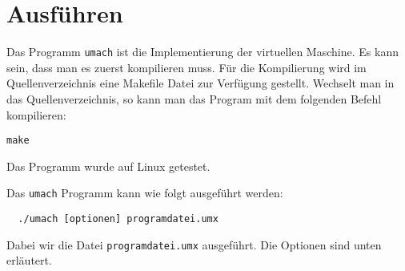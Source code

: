 \section{Ausführen}

Das Programm \texttt{umach} ist die Implementierung der virtuellen Maschine. Es
kann sein, dass man es zuerst kompilieren muss. Für die Kompilierung wird im
Quellenverzeichnis eine Makefile Datei zur Verfügung gestellt. Wechselt man in
das Quellenverzeichnis, so kann man das Program mit dem folgenden Befehl
kompilieren:
\begin{lstlisting}
make
\end{lstlisting}
Das Programm wurde auf Linux getestet.


Das \texttt{umach} Programm kann wie folgt ausgeführt werden:
\begin{lstlisting}
  ./umach [optionen] programdatei.umx
\end{lstlisting}

Dabei wir die Datei \texttt{programdatei.umx} ausgeführt. Die Optionen sind
unten erläutert.


